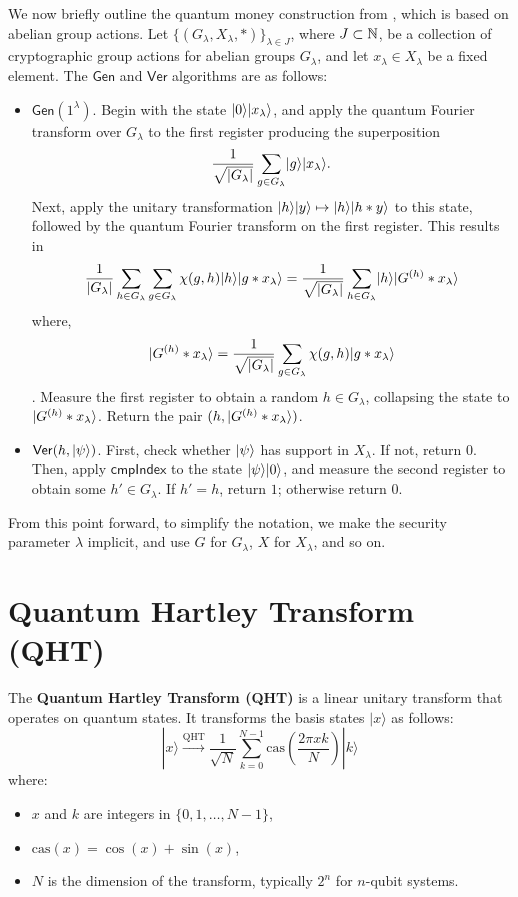 \documentclass[11pt]{article}
\theoremstyle{definition}
\newcommand{\comph}{\mathsf{cmpIndex}}
\newcommand{\gen}{\mathsf{Gen}}
\newcommand{\ver}{\mathsf{Ver}}
\begin{document}
We now briefly outline the quantum money construction from \cite{zhandry2024quantum}, which is based on abelian group actions. Let $\{(G_\lambda, X_\lambda, *)\}_{\lambda \in J}$, where $J \subset \mathbb{N}$, be a collection of cryptographic group actions for abelian groups $G_\lambda$, and let $x_\lambda \in X_\lambda$ be a fixed element. The $\gen$ and $\ver$ algorithms are as follows:
\begin{itemize}
\item $\gen(1^\lambda)$. Begin with the state $\lvert0\rangle\lvert x_\lambda\rangle$, and apply the quantum Fourier transform over $G_\lambda$ to the first register producing the superposition
    \[ \frac{1}{\sqrt{\lvert G_\lambda\rvert}} \sum_{g \in G_\lambda} \lvert g\rangle\lvert x_\lambda\rangle. \]
    Next, apply the unitary transformation $\lvert h\rangle\lvert y\rangle \mapsto \lvert h\rangle\lvert h * y\rangle$ to this state, followed by the quantum Fourier transform on the first register. This results in
    \[ \frac{1}{\lvert G_\lambda\rvert} \sum_{h \in G_\lambda} \sum_{g \in G_\lambda} \chi(g, h) \lvert h\rangle\lvert g * x_\lambda\rangle = \frac{1}{\sqrt{\lvert G_\lambda\rvert}} \sum_{h \in G_\lambda} \lvert h\rangle \lvert G^{(h)} * x_\lambda\rangle \]
    where,
    \[
    \lvert G^{(h)}*x_\lambda\rangle = \frac{1}{\sqrt{|G_\lambda|}}\sum_{g \in G_\lambda}\chi(g,h)\lvert g*x_\lambda\rangle
    \]
    . Measure the first register to obtain a random $h \in G_\lambda$, collapsing the state to $\lvert G^{(h)} * x_\lambda\rangle$. Return the pair $(h, \lvert G^{(h)} * x_\lambda\rangle)$.

\item $\ver(h, \ket{\psi})$. First, check whether $\lvert\psi\rangle$ has support in $X_\lambda$. If not, return $0$. Then, apply $\comph$ to the state $\lvert\psi\rangle\lvert0\rangle$, and measure the second register to obtain some $h' \in G_\lambda$. If $h' = h$, return $1$; otherwise return $0$.
\end{itemize}

From this point forward, to simplify the notation, we make the security parameter $\lambda$ implicit, and use $G$ for $G_\lambda$, $X$ for $X_\lambda$, and so on. 




\section*{Quantum Hartley Transform (QHT)}

The \textbf{Quantum Hartley Transform (QHT)} is a linear unitary transform that operates on quantum states. It transforms the basis states \( |x\rangle \) as follows:
\[
|x\rangle \xrightarrow{\text{QHT}} \frac{1}{\sqrt{N}} \sum_{k=0}^{N-1} \text{cas}\left(\frac{2\pi x k}{N}\right) |k\rangle
\]
where:
\begin{itemize}
    \item \( x \) and \( k \) are integers in \( \{0, 1, \dots, N-1\} \),
    \item \( \text{cas}(x) = \cos(x) + \sin(x) \),
    \item \( N \) is the dimension of the transform, typically \( 2^n \) for \( n \)-qubit systems.
\end{itemize}
\end{document}
